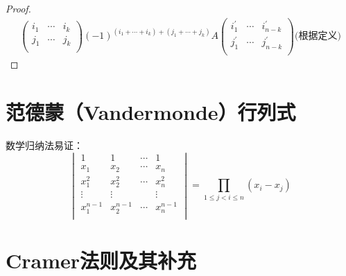 \begin{proof}
\begin{equation*}
\begin{split}
\begin{pmatrix}
                    i_{1} & \cdots & i_{k}\\
                    j_{1} & \cdots & j_{k}\\
                \end{pmatrix}
                (-1)^{(i_1 + \cdots + i_k) + (j_1 + \cdots + j_k)}A
                \begin{pmatrix}
                    i_{1}^{'} & \cdots & i_{n-k}^{'}\\
                    j_{1}^{'} & \cdots & j_{n-k}^{'}\\
                \end{pmatrix}
                \text{(根据定义)}
        \end{split}
    \end{equation*}
\end{proof}

\section{范德蒙（Vandermonde）行列式}
数学归纳法易证：
\begin{equation*}
    \begin{vmatrix}
        1 & 1 & \cdots & 1  \\
        x_1 & x_2 & \cdots & x_n \\
        x_1^2 & x_2^2 &\cdots & x_n^2 \\
        \vdots & \vdots & & \vdots \\
        x_1^{n-1} & x_2^{n-1} &\cdots & x_n^{n-1} \\
    \end{vmatrix}
    = \prod_{1 \leq j < i \leq n}^{}(x_i - x_j)
\end{equation*}

\section{Cramer法则及其补充}


